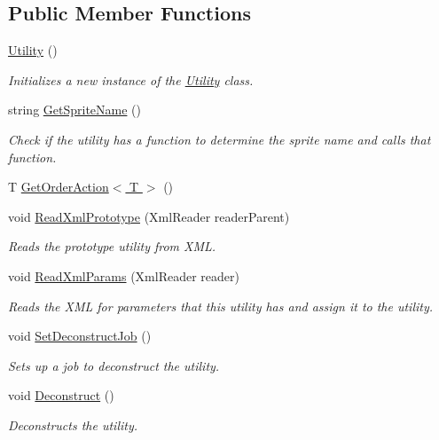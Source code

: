 \subsection*{Public Member Functions}
\begin{DoxyCompactItemize}
\item 
\hyperlink{class_utility_a71a0ed20d9aac655319458fcb2012518}{Utility} ()
\begin{DoxyCompactList}\small\item\em Initializes a new instance of the \hyperlink{class_utility}{Utility} class. \end{DoxyCompactList}\item 
string \hyperlink{class_utility_ae8719e73fda166b35ddec2b93a6a336f}{Get\+Sprite\+Name} ()
\begin{DoxyCompactList}\small\item\em Check if the utility has a function to determine the sprite name and calls that function. \end{DoxyCompactList}\item 
T \hyperlink{class_utility_a9b4b77e3b110b715f56d5a06824f691a}{Get\+Order\+Action$<$ T $>$} ()
\item 
void \hyperlink{class_utility_a4ad3d6bda3c087221a7ec2a5a309d79e}{Read\+Xml\+Prototype} (Xml\+Reader reader\+Parent)
\begin{DoxyCompactList}\small\item\em Reads the prototype utility from X\+ML. \end{DoxyCompactList}\item 
void \hyperlink{class_utility_a7c02fda89553fa462d1cbaa78803ece3}{Read\+Xml\+Params} (Xml\+Reader reader)
\begin{DoxyCompactList}\small\item\em Reads the X\+ML for parameters that this utility has and assign it to the utility. \end{DoxyCompactList}\item 
void \hyperlink{class_utility_a47849b1b0e692c3736df84a0944d8312}{Set\+Deconstruct\+Job} ()
\begin{DoxyCompactList}\small\item\em Sets up a job to deconstruct the utility. \end{DoxyCompactList}\item 
void \hyperlink{class_utility_a30304ee98c9e7f29c66584cbd8e393c0}{Deconstruct} ()
\begin{DoxyCompactList}\small\item\em Deconstructs the utility. \end{DoxyCompactList}\item 

\end{DoxyCompactItemize}
